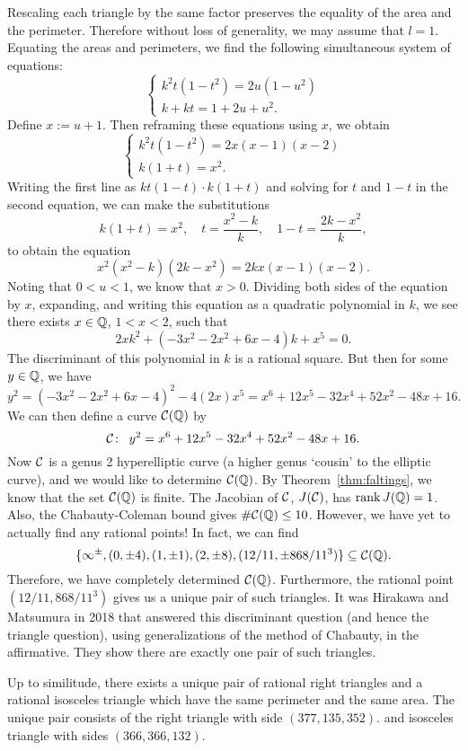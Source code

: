\begin{ex}
Rescaling each triangle by the same factor preserves the equality of the area and the perimeter. Therefore without loss of generality, we may assume that $l= 1$. Equating the areas and perimeters, we find the following simultaneous system of equations:
	\[
	\begin{cases}
	k^2 t (1 - t^2)= 2u (1 - u^2) \\
	k + kt= 1 + 2u + u^2.
	\end{cases}
	\]
Define $x:= u + 1$. Then reframing these equations using $x$, we obtain
	\[
	\begin{cases}
	k^2 t (1 - t^2)= 2x (x - 1) (x - 2) \\
	k(1+t)= x^2.
	\end{cases}
	\]
Writing the first line as $kt(1-t) \cdot k(1+t)$ and solving for $t$ and $1-t$ in the second equation, we can make the substitutions
	\[
	k(1 + t)= x^2, \quad t= \dfrac{x^2 - k}{k}, \quad 1 - t= \dfrac{2k - x^2}{k},
	\]
to obtain the equation
	\[
	x^2 (x^2 - k)(2k - x^2)= 2kx(x - 1)(x - 2).
	\]
Noting that $0 < u < 1$, we know that $x > 0$. Dividing both sides of the equation by $x$, expanding, and writing this equation as a quadratic polynomial in $k$, we see there exists $x \in \mathbb{Q}$, $1 < x < 2$, such that 
	\[
	2xk^2 + (-3x^2 - 2x^2 + 6x - 4)k + x^5= 0. 
	\]
The discriminant of this polynomial in $k$ is a rational square. But then for some $y \in \mathbb{Q}$, we have
	\[
	y^2= (-3x^2 - 2x^2 + 6x - 4)^2 - 4(2x)x^5= x^6 + 12x^5 - 32x^4 + 52x^2 - 48x + 16.
	\]
We can then define a curve $\mathcal{C}(\mathbb{Q})$ by
	\[
	\mathcal{C} \colon \enskip y^2= x^6 + 12x^5 - 32x^4 + 52x^2 - 48x + 16.
	\]
Now $\mathcal{C}$ is a genus 2 hyperelliptic curve (a higher genus `cousin' to the elliptic curve), and we would like to determine $\mathcal{C}(\mathbb{Q})$. By Theorem~\ref{thm:faltings}, we know that the set $\mathcal{C}(\mathbb{Q})$ is finite. The Jacobian of $\mathcal{C}$, $J(\mathcal{C})$, has $\operatorname{rank} J(\mathbb{Q})=1$. Also, the Chabauty-Coleman bound gives $\#\mathcal{C}(\mathbb{Q}) \leq 10$. However, we have yet to actually find any rational points! In fact, we can find 
	\[
	\{\infty^\pm, (0,\pm 4), (1,\pm 1), (2, \pm 8), (12/11,\pm 868/11^3) \} \subseteq \mathcal{C}(\mathbb{Q}).
	\]
Therefore, we have completely determined $\mathcal{C}(\mathbb{Q})$. Furthermore, the rational point $(12/11,868/11^3)$ gives us a unique pair of such triangles. It was Hirakawa and Matsumura in 2018 that answered this discriminant question (and hence the triangle question), using generalizations of the method of Chabauty, in the affirmative. They show there are exactly one pair of such triangles.


\begin{thm}
Up to similitude, there exists a unique pair of rational right triangles and a rational isosceles triangle which have the same perimeter and the same area. The unique pair consists of the right triangle with side $(377,135,352)$. and isosceles triangle with sides $(366,366,132)$. 
\end{thm}
\end{ex}